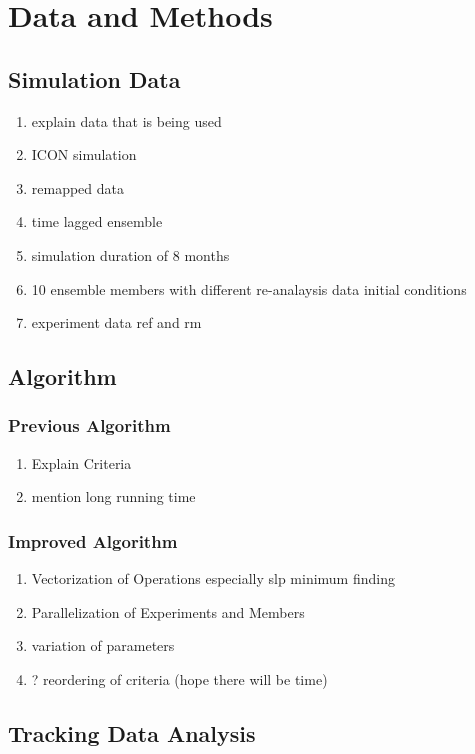 \chapter{Data and Methods}\label{sec:methods}

\section{Simulation Data}\label{sec:data}
\begin{enumerate}
    \item explain data that is being used
    \item ICON simulation
    \item remapped data
    \item time lagged ensemble
    \item simulation duration of 8 months
    \item 10 ensemble members with different re-analaysis data initial conditions
    \item experiment data ref and rm
\end{enumerate}
\section{Algorithm}
\subsection{Previous Algorithm}
\begin{enumerate}
    \item Explain Criteria
    \item mention long running time
\end{enumerate}
\subsection{Improved Algorithm}
\begin{enumerate}
    \item Vectorization of Operations especially slp minimum finding
    \item Parallelization of Experiments and Members
    \item variation of parameters
    \item ? reordering of criteria (hope there will be time)
\end{enumerate}
\section{Tracking Data Analysis}
